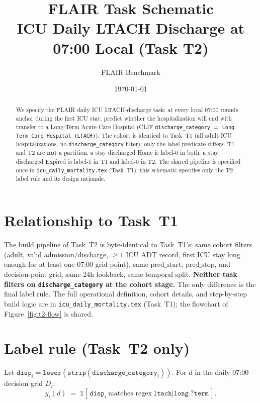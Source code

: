 \documentclass[11pt]{article}
\title{\textbf{FLAIR Task Schematic} \\[0.3em]
       ICU Daily LTACH Discharge at 07:00 Local (Task T2)}
\author{FLAIR Benchmark}
\date{\today}
\newcommand{\predstart}{\text{pred\_start}}
\newcommand{\predstop}{\text{pred\_stop}}
\begin{document}
\maketitle

\begin{abstract}
\noindent We specify the FLAIR daily ICU LTACH-discharge task: at
every local 07:00 rounds anchor during the first ICU stay, predict
whether the hospitalization will end with transfer to a Long-Term
Acute Care Hospital (CLIF \texttt{discharge\_category} $=$
\texttt{Long Term Care Hospital (LTACH)}). The cohort is identical
to Task~T1 (all adult ICU hospitalizations, no
\texttt{discharge\_category} filter); only the label predicate
differs. T1 and T2 are \textbf{not} a partition: a stay discharged
Home is label-0 in both; a stay discharged Expired is label-1 in T1
and label-0 in T2. The shared pipeline is specified once in
\texttt{icu\_daily\_mortality.tex} (Task~T1); this schematic specifies
only the T2 label rule and its design rationale.
\end{abstract}

\section{Relationship to Task~T1}

The build pipeline of Task~T2 is byte-identical to Task~T1's: same
cohort filters (adult, valid admission/discharge, $\geq 1$ ICU ADT
record, first ICU stay long enough for at least one 07:00 grid point),
same $\predstart$, $\predstop$, and decision-point grid, same 24h
lookback, same temporal split. \textbf{Neither task filters on
\texttt{discharge\_category} at the cohort stage.} The only difference
is the final label rule. The full operational definition, cohort
details, and step-by-step build logic are in
\texttt{icu\_daily\_mortality.tex} (Task~T1); the flowchart of
Figure~\ref{fig:t2-flow} is shared.

\section{Label rule (Task~T2 only)}

Let
$\texttt{disp}_i = \texttt{lower}(\texttt{strip}(\texttt{discharge\_category}_i))$.
For $d$ in the daily 07:00 decision grid $D_i$:
\[
y_i(d) \;=\; \mathbb{1}\!\left[\,\texttt{disp}_i\ \text{matches regex}\
\texttt{ltach|long.?term}\,\right].
\]
\end{document}
